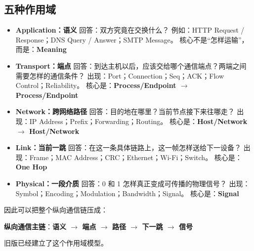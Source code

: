 \documentclass[11pt,a4paper,openany]{ctexbook}
\newcommand{\key}[1]{\textbf{\color{deep}#1}}
\begin{document}
\subsection{五种作用域}
\begin{itemize}
    \item \textbf{Application：语义} \newline
    回答：双方究竟在交换什么？\newline
    例如：HTTP Request / Response；DNS Query / Answer；SMTP Message。\newline
    核心不是“怎样运输”，而是：\key{Meaning}

    \item \textbf{Transport：端点} \newline
    回答：到达主机以后，应该交给哪个通信端点？两端之间需要怎样的通信条件？\newline
    出现：Port；Connection；Seq；ACK；Flow Control；Reliability。\newline
    核心是：\key{Process/Endpoint $\rightarrow$ Process/Endpoint}

    \item \textbf{Network：跨网络路径} \newline
    回答：目的地在哪里？当前节点接下来往哪走？\newline
    出现：IP Address；Prefix；Forwarding；Routing。\newline
    核心是：\key{Host/Network $\rightarrow$ Host/Network}

    \item \textbf{Link：当前一跳} \newline
    回答：在这一条具体链路上，这一帧怎样送给下一设备？\newline
    出现：Frame；MAC Address；CRC；Ethernet；Wi-Fi；Switch。\newline
    核心是：\key{One Hop}

    \item \textbf{Physical：一段介质} \newline
    回答：0 和 1 怎样真正变成可传播的物理信号？\newline
    出现：Symbol；Encoding；Modulation；Bandwidth；Signal。\newline
    核心是：\key{Signal}
\end{itemize}

因此可以把整个纵向通信链压成：
\begin{center}
\textbf{纵向通信主链}：\key{语义 $\rightarrow$ 端点 $\rightarrow$ 路径 $\rightarrow$ 下一跳 $\rightarrow$ 信号}
\end{center}
旧版已经建立了这个作用域模型。
\end{document}
